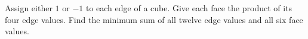 Assign either $ 1 $ or $-1 $ to each edge of a cube. Give each face the product of its four edge values. Find the minimum sum of all twelve edge values and all six face values.
